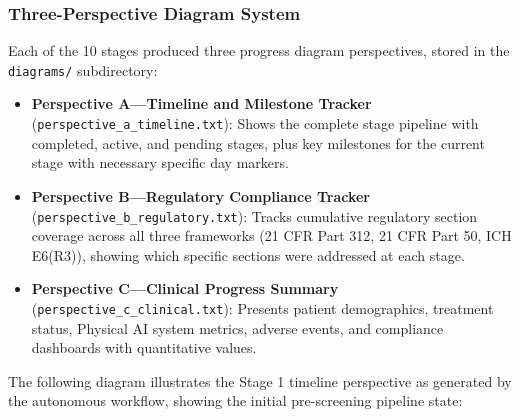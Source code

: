 \documentclass{article}
\begin{document}
\subsubsection{Three-Perspective Diagram System}

Each of the 10 stages produced three progress diagram perspectives, stored in the \texttt{diagrams/} subdirectory:

\begin{itemize}[leftmargin=*]
\item \textbf{Perspective A---Timeline and Milestone Tracker} (\texttt{perspective\_a\_timeline.txt}): Shows the complete stage pipeline with completed, active, and pending stages, plus key milestones for the current stage with necessary specific day markers.

\item \textbf{Perspective B---Regulatory Compliance Tracker} (\texttt{perspective\_b\_regulatory.txt}): Tracks cumulative regulatory section coverage across all three frameworks (21 CFR Part 312, 21 CFR Part 50, ICH E6(R3)), showing which specific sections were addressed at each stage.

\item \textbf{Perspective C---Clinical Progress Summary} (\texttt{perspective\_c\_clinical.txt}): Presents patient demographics, treatment status, Physical AI system metrics, adverse events, and compliance dashboards with quantitative values.
\end{itemize}

The following diagram illustrates the Stage 1 timeline perspective as generated by the autonomous workflow, showing the initial pre-screening pipeline state:

\newpage
\end{document}
